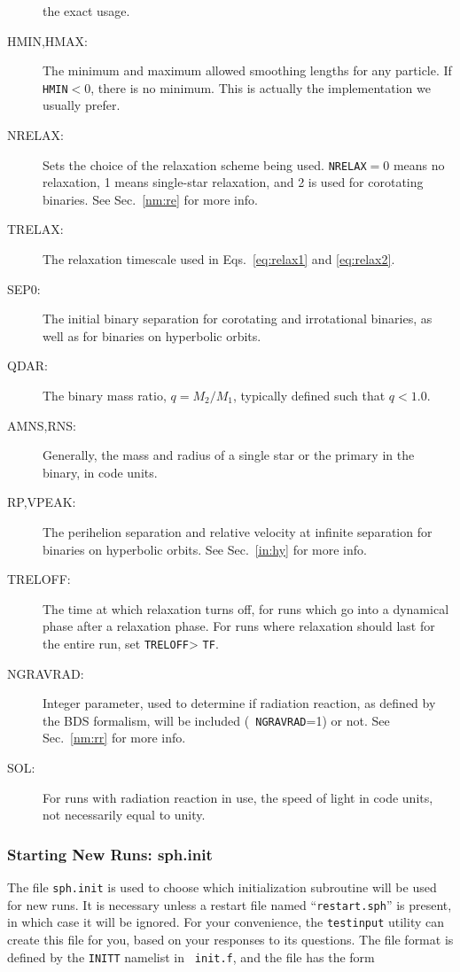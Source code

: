 \begin{description}
the exact usage.
\item[HMIN,HMAX:] The minimum and maximum allowed smoothing lengths
for any particle.  If {\tt HMIN}$<0$, there is no minimum.  This is
actually the implementation we usually prefer. 
\item[NRELAX:] Sets the choice of the relaxation scheme being used.
{\tt NRELAX}$=0$ means no relaxation, 1 means single-star relaxation,
and 2 is used for corotating binaries.  See Sec.~\ref{nm:re} for more
info.
\item[TRELAX:] The relaxation timescale used in Eqs.~\ref{eq:relax1} and 
\ref{eq:relax2}.
\item[SEP0:] The initial binary separation for corotating and
irrotational binaries, as well as for binaries on hyperbolic orbits.
\item[QDAR:] The binary mass ratio, $q=M_2/M_1$, typically defined
such that $q<1.0$.
\item[AMNS,RNS:] Generally, the mass and radius of a single star or
the primary in the binary, in code units.
\item[RP,VPEAK:] The perihelion separation and relative velocity at
infinite separation for binaries on hyperbolic orbits.  See
Sec.~\ref{in:hy} for more info.
\item[TRELOFF:] The time at which relaxation turns off, for runs which
go into a dynamical phase after a relaxation phase.  For runs where
relaxation should last for the entire run, set {\tt TRELOFF}\textgreater
{\tt TF}.
\item[NGRAVRAD:] Integer parameter, used to determine if radiation
reaction, as defined by the BDS formalism, will be included ({\tt
NGRAVRAD}=1) or not.  See Sec.~\ref{nm:rr} for more info.
\item[SOL:] For runs with radiation reaction in use, the speed of
light in code units, not necessarily equal to unity.
\end{description}

\subsubsection{Starting New Runs: sph.init}
\label{io:in:init}
The file {\tt sph.init} is used to choose which initialization
subroutine will be used for new runs.  It is necessary unless a
restart file named ``{\tt restart.sph}'' is present, in which case it
will be ignored.
For your convenience, the {\tt testinput} utility can create this file
for you, based on your responses to its questions.
The file format is defined by the {\tt INITT} namelist in {\tt
init.f}, and the file has the form

